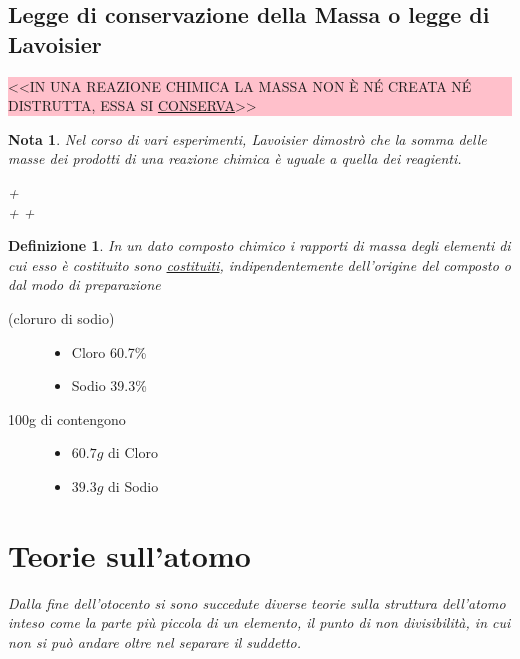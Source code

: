 \documentclass{book}
\newtheorem{defi}{Definizione}[section]
\newtheorem{nota}{Nota}[section]
\begin{document}
\subsection{Legge di conservazione della Massa o legge di Lavoisier}
\label{sec:legdiconse}
\colorbox{pink}
{
\begin{minipage}{.97\textwidth}
    <<IN UNA REAZIONE CHIMICA LA MASSA NON È NÉ CREATA NÉ DISTRUTTA, ESSA SI \underline{CONSERVA}>>
\end{minipage}
}
\begin{nota}
  Nel corso di vari esperimenti, Lavoisier dimostrò che la somma delle masse dei prodotti di una reazione chimica è
  uguale a quella dei reagienti.
  \begin{center}
     \textrightarrow {}+\\
     +  \textrightarrow {}+
  \end{center}
\end{nota}
\begin{defi}
  In un dato composto chimico i rapporti di massa degli elementi di cui esso è costituito sono
  \underline{costituiti}, indipendentemente dell'origine del composto o dal modo di preparazione
\end{defi}
\begin{description}
\item[ (cloruro di sodio)]
  \begin{itemize}
  \item Cloro 60.7\%
  \item Sodio 39.3\%
  \end{itemize}
\item[100g di  contengono]
  \begin{itemize}
  \item $60.7g$ di Cloro
  \item $39.3g$ di Sodio
  \end{itemize}
\end{description}

\section{Teorie sull'atomo}
\label{sec:atomo}
\textit{Dalla fine dell'otocento si sono succedute diverse teorie sulla struttura dell'atomo inteso come
  la parte più piccola di un elemento, il punto di non divisibilità, in cui non si può andare oltre nel separare il
  suddetto.}
\end{document}
